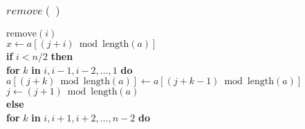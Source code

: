 \documentclass{beamer}
\begin{document}
\begin{frame}
\frametitle{$remove()$}
\begin{oframed}
\begin{flushleft}
\hspace*{1em} $\ensuremath{\mathrm{remove}(\ensuremath{\mathit{i}})}$ \\

\hspace*{1em} \hspace*{1em} $\ensuremath{\ensuremath{\mathit{x}} \gets  \ensuremath{\ensuremath{\mathit{a}}[(\ensuremath{\mathit{j}}+\ensuremath{\mathit{i}})\bmod \mathrm{length}(\ensuremath{\mathit{a}})]}}$\\
\hspace*{1em} \hspace*{1em} {\color{black} \textbf{if}} $\ensuremath{\ensuremath{\mathit{i}} < \ensuremath{\mathit{n}} / 2}$ {\color{black} \textbf{then}} \\
\hspace*{1em} \hspace*{1em} \hspace*{1em} {\color{black} \textbf{for}} $\ensuremath{k}$ {\color{black} \textbf{in}} $\ensuremath{\ensuremath{\mathit{i}},\ensuremath{\mathit{i}}-1,\ensuremath{\mathit{i}}-2,\ldots,1}$ {\color{black} \textbf{do}} \\
\hspace*{1em} \hspace*{1em} \hspace*{1em} \hspace*{1em} $\ensuremath{\ensuremath{\mathit{a}}[\ensuremath{(\ensuremath{\mathit{j}}+\ensuremath{\mathit{k}})\bmod \mathrm{length}(\ensuremath{\mathit{a}})}] \gets  \ensuremath{\ensuremath{\mathit{a}}[(\ensuremath{\mathit{j}}+\ensuremath{\mathit{k}}-1)\bmod \mathrm{length}(\ensuremath{\mathit{a}})]}}$\\
\hspace*{1em} \hspace*{1em} \hspace*{1em} $\ensuremath{\ensuremath{\mathit{j}} \gets  \ensuremath{(\ensuremath{\mathit{j}}+1) \bmod  \mathrm{length}(\ensuremath{\mathit{a}})}}$\\
\hspace*{1em} \hspace*{1em} {\color{black} \textbf{else}} \\
\hspace*{1em} \hspace*{1em} \hspace*{1em} {\color{black} \textbf{for}} $\ensuremath{k}$ {\color{black} \textbf{in}} $\ensuremath{\ensuremath{\mathit{i}},\ensuremath{\mathit{i}}+1,\ensuremath{\mathit{i}}+2,\ldots,\ensuremath{\mathit{n}}-2}$ {\color{black} \textbf{do}}  \\

\end{flushleft}
\end{oframed}
\end{frame}
\end{document}
